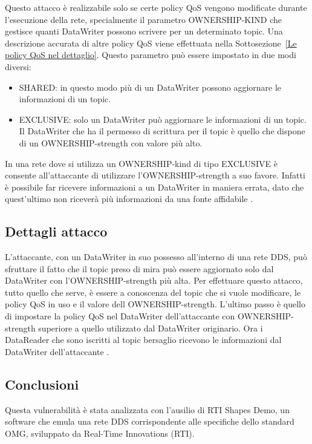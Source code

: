 Questo attacco è realizzabile solo se certe policy QoS vengono
modificate durante l'esecuzione della rete, specialmente il parametro
OWNERSHIP-KIND che gestisce quanti DataWriter possono scrivere per un
determinato topic. Una descrizione accurata di altre policy QoS viene 
effettuata nella Sottosezione~\ref{Le policy QoS nel dettaglio}.
Questo parametro può essere impostato in due modi diversi:
\begin{itemize}
    \item SHARED: in questo modo più di un DataWriter possono aggiornare le
    informazioni di un topic.
    \item EXCLUSIVE: solo un DataWriter può aggiornare le informazioni di un
    topic. Il DataWriter che ha il permesso di scrittura per il topic è quello
    che dispone di un OWNERSHIP-strength con valore più alto.
\end{itemize}
In una rete dove si utilizza un OWNERSHIP-kind di tipo EXCLUSIVE è consente
all'attaccante di utilizzare l'OWNERSHIP-strength a suo favore.
Infatti è possibile far ricevere informazioni a un DataWriter
in maniera errata, dato che quest'ultimo non riceverà più informazioni da
una fonte affidabile 
\cite{DBLP:conf/malware/MichaudDL18}.


\subsection{Dettagli attacco}
L'attaccante, con un DataWriter in suo possesso all'interno di una rete DDS,
può sfruttare il fatto che il topic preso di mira può essere aggiornato
solo dal DataWriter con l'OWNERSHIP-strength più alta.
Per effettuare questo attacco, tutto quello che serve, è 
essere a conoscenza del topic che
si vuole modificare, le policy QoS in uso e il valore dell OWNERSHIP-strength.
L'ultimo passo è quello di impostare la policy QoS nel DataWriter
dell'attaccante con OWNERSHIP-strength superiore a quello utilizzato dal
DataWriter originario.
Ora i DataReader che sono iscritti al topic bersaglio
ricevono le informazioni dal DataWriter dell'attaccante
\cite{DBLP:conf/malware/MichaudDL18}.


\subsection{Conclusioni}
Questa vulnerabilità è stata analizzata con l'ausilio di RTI Shapes Demo, un 
software che emula una rete DDS corrispondente alle specifiche 
dello standard OMG, sviluppato da Real-Time Innovations (RTI).

